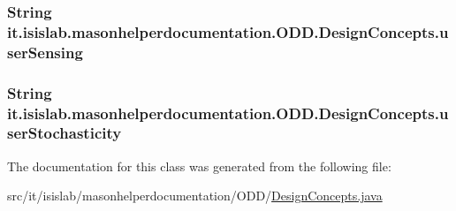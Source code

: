 \hypertarget{classit_1_1isislab_1_1masonhelperdocumentation_1_1_o_d_d_1_1_design_concepts_a79cb2b2a618b459fff8bb1fc129ce3cf}{
\subsubsection[{user\-Sensing}]{\setlength{\rightskip}{0pt plus 5cm}String it.\-isislab.\-masonhelperdocumentation.\-O\-D\-D.\-Design\-Concepts.\-user\-Sensing\hspace{0.3cm}{\ttfamily [package]}}}\label{classit_1_1isislab_1_1masonhelperdocumentation_1_1_o_d_d_1_1_design_concepts_a79cb2b2a618b459fff8bb1fc129ce3cf}
\hypertarget{classit_1_1isislab_1_1masonhelperdocumentation_1_1_o_d_d_1_1_design_concepts_a927ab93d0fab6d30ff07bbd099a84163}{
\subsubsection[{user\-Stochasticity}]{\setlength{\rightskip}{0pt plus 5cm}String it.\-isislab.\-masonhelperdocumentation.\-O\-D\-D.\-Design\-Concepts.\-user\-Stochasticity\hspace{0.3cm}{\ttfamily [package]}}}\label{classit_1_1isislab_1_1masonhelperdocumentation_1_1_o_d_d_1_1_design_concepts_a927ab93d0fab6d30ff07bbd099a84163}


The documentation for this class was generated from the following file\-:\begin{DoxyCompactItemize}
\item 
src/it/isislab/masonhelperdocumentation/\-O\-D\-D/\hyperlink{_design_concepts_8java}{Design\-Concepts.\-java}\end{DoxyCompactItemize}
